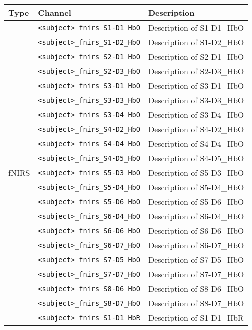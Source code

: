 \begin{table}
\centering
\begin{tabularx}{\textwidth}{|l|l|X|}
\hline
\textbf{Type} & \textbf{Channel} & \textbf{Description} \\
\hline
\multirow{40}{*}{fNIRS}
& \texttt{<subject>\_fnirs\_S1-D1\_HbO} & Description of S1-D1\_HbO \\
& \texttt{<subject>\_fnirs\_S1-D2\_HbO} & Description of S1-D2\_HbO \\
& \texttt{<subject>\_fnirs\_S2-D1\_HbO} & Description of S2-D1\_HbO \\
& \texttt{<subject>\_fnirs\_S2-D3\_HbO} & Description of S2-D3\_HbO \\
& \texttt{<subject>\_fnirs\_S3-D1\_HbO} & Description of S3-D1\_HbO \\
& \texttt{<subject>\_fnirs\_S3-D3\_HbO} & Description of S3-D3\_HbO \\
& \texttt{<subject>\_fnirs\_S3-D4\_HbO} & Description of S3-D4\_HbO \\
& \texttt{<subject>\_fnirs\_S4-D2\_HbO} & Description of S4-D2\_HbO \\
& \texttt{<subject>\_fnirs\_S4-D4\_HbO} & Description of S4-D4\_HbO \\
& \texttt{<subject>\_fnirs\_S4-D5\_HbO} & Description of S4-D5\_HbO \\
& \texttt{<subject>\_fnirs\_S5-D3\_HbO} & Description of S5-D3\_HbO \\
& \texttt{<subject>\_fnirs\_S5-D4\_HbO} & Description of S5-D4\_HbO \\
& \texttt{<subject>\_fnirs\_S5-D6\_HbO} & Description of S5-D6\_HbO \\
& \texttt{<subject>\_fnirs\_S6-D4\_HbO} & Description of S6-D4\_HbO \\
& \texttt{<subject>\_fnirs\_S6-D6\_HbO} & Description of S6-D6\_HbO \\
& \texttt{<subject>\_fnirs\_S6-D7\_HbO} & Description of S6-D7\_HbO \\
& \texttt{<subject>\_fnirs\_S7-D5\_HbO} & Description of S7-D5\_HbO \\
& \texttt{<subject>\_fnirs\_S7-D7\_HbO} & Description of S7-D7\_HbO \\
& \texttt{<subject>\_fnirs\_S8-D6\_HbO} & Description of S8-D6\_HbO \\
& \texttt{<subject>\_fnirs\_S8-D7\_HbO} & Description of S8-D7\_HbO \\
& \texttt{<subject>\_fnirs\_S1-D1\_HbR} & Description of S1-D1\_HbR \\

\end{tabularx}
\end{table}
